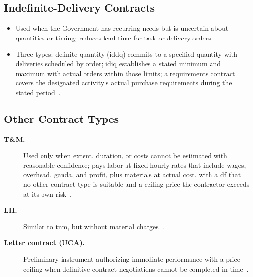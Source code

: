 \documentclass[../main.tex]{subfiles}
\begin{document}
\subsection{Indefinite-Delivery Contracts}
\begin{itemize}
  \item Used when the Government has recurring needs but is uncertain about quantities or timing; reduces lead time for task or delivery orders~\autocite{edo-3-2-2-solicitation-prep-2025,FAR-16-501-2-Indefinite-Delivery,FAR-16-504-IDIQ}.
  \item Three types: definite-quantity (\ac{iddq}) commits to a specified quantity with deliveries scheduled by order; \ac{idiq} establishes a stated minimum and maximum with actual orders within those limits; a requirements contract covers the designated activity's actual purchase requirements during the stated period~\autocite{edo-3-2-2-solicitation-prep-2025,FAR-16-501-2-Indefinite-Delivery}.
\end{itemize}

\subsection{Other Contract Types}
\begin{description}
  \item[\textbf{T\&M.}] Used only when extent, duration, or costs cannot be estimated with reasonable confidence; pays labor at fixed hourly rates that include wages, overhead, \ac{ganda}, and profit, plus materials at actual cost, with a \ac{df} that no other contract type is suitable and a ceiling price the contractor exceeds at its own risk~\autocite{edo-3-2-2-solicitation-prep-2025,FAR-16-601-Time-Materials}.
  \item[\textbf{LH.}] Similar to \ac{tnm}, but without material charges~\autocite{edo-3-2-2-solicitation-prep-2025,FAR-16-602-Labor-Hour}.
  \item[\textbf{Letter contract (UCA).}] Preliminary instrument authorizing immediate performance with a price ceiling when definitive contract negotiations cannot be completed in time~\autocite{edo-3-2-2-solicitation-prep-2025,FAR-16-603-1-Letter-Contracts}.
\end{description}
\end{document}
